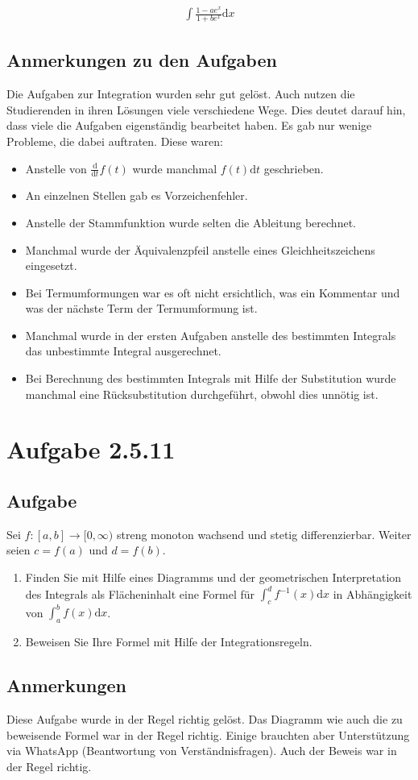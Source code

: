 \documentclass[a4paper]{article}
\begin{document}
\begin{align}
  \int \frac{1-ae^x}{1+be^x} \mathrm dx
\end{align}

\subsection{Anmerkungen zu den Aufgaben}

Die Aufgaben zur Integration wurden sehr gut gelöst. Auch nutzen die Studierenden in ihren Lösungen viele verschiedene Wege. Dies deutet darauf hin, dass viele die Aufgaben eigenständig bearbeitet haben. Es gab nur wenige Probleme, die dabei auftraten. Diese waren:

\begin{itemize}
  \item Anstelle von $\frac{\mathrm d}{\mathrm dt} f(t)$ wurde manchmal $f(t) \mathrm dt$ geschrieben.
  \item An einzelnen Stellen gab es Vorzeichenfehler.
  \item Anstelle der Stammfunktion wurde selten die Ableitung berechnet.
  \item Manchmal wurde der Äquivalenzpfeil anstelle eines Gleichheitszeichens eingesetzt.
  \item Bei Termumformungen war es oft nicht ersichtlich, was ein Kommentar und was der nächste Term der Termumformung ist.
  \item Manchmal wurde in der ersten Aufgaben anstelle des bestimmten Integrals das unbestimmte Integral ausgerechnet.
  \item Bei Berechnung des bestimmten Integrals mit Hilfe der Substitution wurde manchmal eine Rücksubstitution durchgeführt, obwohl dies unnötig ist.
\end{itemize}

\section{Aufgabe 2.5.11}

\subsection{Aufgabe}

Sei $f:[a,b]\to[0,\infty)$ streng monoton wachsend und stetig differenzierbar. Weiter seien $c=f(a)$ und $d=f(b)$.

\begin{enumerate}
  \item Finden Sie mit Hilfe eines Diagramms und der geometrischen Interpretation des Integrals als Flächeninhalt eine Formel für $\int_c^d f^{-1}(x)\mathrm dx$ in Abhängigkeit von $\int_a^b f(x) \mathrm dx$.
  \item Beweisen Sie Ihre Formel mit Hilfe der Integrationsregeln.
\end{enumerate}

\subsection{Anmerkungen}

Diese Aufgabe wurde in der Regel richtig gelöst. Das Diagramm wie auch die zu beweisende Formel war in der Regel richtig. Einige brauchten aber Unterstützung via WhatsApp (Beantwortung von Verständnisfragen). Auch der Beweis war in der Regel richtig.
\end{document}
